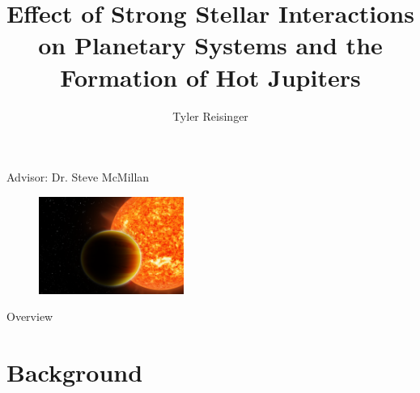 \documentclass{beamer}
\title{Effect of Strong Stellar Interactions on Planetary Systems and
            the Formation of Hot Jupiters}
\author{Tyler Reisinger}
\date{}
\begin{document}

\begin{frame}
    \maketitle
    \begin{center}
        Advisor: Dr. Steve McMillan
    \end{center}
    \begin{figure}
        \centering
        \includegraphics[height=1.25in]{Image1_HotJupiter1}
    \end{figure}
\end{frame}

\begin{frame}{Overview}
    \tableofcontents
\end{frame}

\section{Background}
\end{document}
